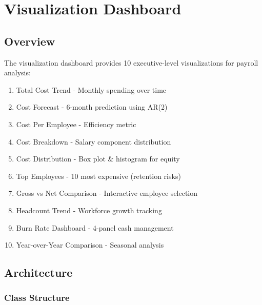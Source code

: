 \chapter{Visualization Dashboard}

\section{Overview}

The visualization dashboard provides 10 executive-level visualizations for payroll analysis:

\begin{enumerate}
    \item Total Cost Trend - Monthly spending over time
    \item Cost Forecast - 6-month prediction using AR(2)
    \item Cost Per Employee - Efficiency metric
    \item Cost Breakdown - Salary component distribution
    \item Cost Distribution - Box plot \& histogram for equity
    \item Top Employees - 10 most expensive (retention risks)
    \item Gross vs Net Comparison - Interactive employee selection
    \item Headcount Trend - Workforce growth tracking
    \item Burn Rate Dashboard - 4-panel cash management
    \item Year-over-Year Comparison - Seasonal analysis
\end{enumerate}

\section{Architecture}

\subsection{Class Structure}

